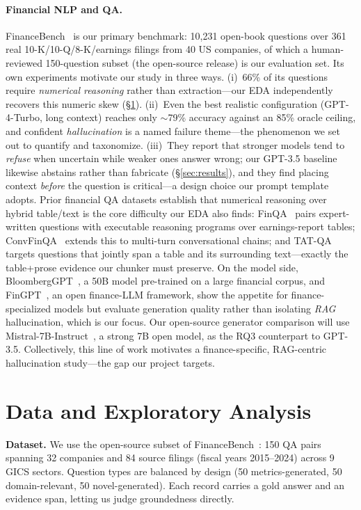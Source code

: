 \documentclass[11pt]{article}
\begin{document}
\paragraph{Financial NLP and QA.}
FinanceBench~\citep{islam2023financebench} is our primary benchmark: 10{,}231
open-book questions over 361 real 10-K/10-Q/8-K/earnings filings from 40 US
companies, of which a human-reviewed 150-question subset (the open-source
release) is our evaluation set. Its own experiments motivate our study in three
ways. (i)~66\% of its questions require \emph{numerical reasoning} rather than
extraction---our EDA independently recovers this numeric skew (\S\ref{sec:data}).
(ii)~Even the best realistic configuration (GPT-4-Turbo, long context) reaches
only $\sim$79\% accuracy against an 85\% oracle ceiling, and confident
\emph{hallucination} is a named failure theme---the phenomenon we set out to
quantify and taxonomize. (iii)~They report that stronger models tend to
\emph{refuse} when uncertain while weaker ones answer wrong; our GPT-3.5 baseline
likewise abstains rather than fabricate (\S\ref{sec:results}), and they find
placing context \emph{before} the question is critical---a design choice our
prompt template adopts.
Prior financial QA datasets establish that numerical reasoning over hybrid
table/text is the core difficulty our EDA also finds:
FinQA~\citep{chen2021finqa} pairs expert-written questions with executable
reasoning programs over earnings-report tables;
ConvFinQA~\citep{chen2022convfinqa} extends this to multi-turn conversational
chains; and TAT-QA~\citep{zhu2021tatqa} targets questions that jointly span a
table and its surrounding text---exactly the table+prose evidence our chunker
must preserve. On the model side, BloombergGPT~\citep{wu2023bloomberggpt}, a 50B
model pre-trained on a large financial corpus, and FinGPT~\citep{yang2023fingpt},
an open finance-LLM framework, show the appetite for finance-specialized models
but evaluate generation quality rather than isolating \emph{RAG} hallucination,
which is our focus. Our open-source generator comparison will use
Mistral-7B-Instruct~\citep{jiang2023mistral}, a strong 7B open model, as the RQ3
counterpart to GPT-3.5. Collectively, this line of work motivates a
finance-specific, RAG-centric hallucination study---the gap our project targets.

\section{Data and Exploratory Analysis}
\label{sec:data}
\textbf{Dataset.} We use the open-source subset of
FinanceBench~\citep{islam2023financebench}: 150 QA pairs spanning 32 companies
and 84 source filings (fiscal years 2015--2024) across 9 GICS sectors. Question
types are balanced by design (50 metrics-generated, 50 domain-relevant, 50
novel-generated). Each record carries a gold answer and an evidence span, letting
us judge groundedness directly.
\end{document}
